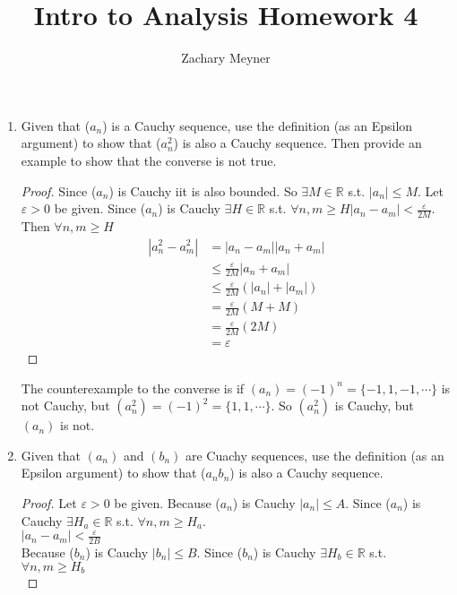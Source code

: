 \documentclass[12pt]{article}
\title{\large Intro to Analysis Homework 4}
\author{\large Zachary Meyner}
\date{}
\begin{document}
\maketitle
\begin{enumerate}
	\item Given that ($a_n$) is a Cauchy sequence, use the definition (as an Epsilon argument) to
	      show that ($a_n^2$) is also a Cauchy sequence. Then provide an example to show that the
	      converse is not true.
	      \begin{proof}
		      Since ($a_n$) is Cauchy iit is also bounded. So $\exists M \in \mathbb{R}$ s.t. $|a_n| \leq M$. Let $\varepsilon > 0$
		      be given. Since ($a_n$) is Cauchy $\exists H \in \mathbb{R}$ s.t. $\forall n,m \geq H |a_n-a_m| < \frac{\varepsilon}{2M}$. \\
		      Then $\forall n,m \geq H$
		      \begin{align*}
			      |a_n^2 - a_m^2| & = |a_n-a_m||a_n+a_m|                       \\
			                      & \leq \frac{\varepsilon}{2M}|a_n+a_m|       \\
			                      & \leq \frac{\varepsilon}{2M}(|a_n| + |a_m|) \\
			                      & = \frac{\varepsilon}{2M}(M+M)              \\
			                      & =\frac{\varepsilon}{2M}(2M)                \\
			                      & = \varepsilon
		      \end{align*}
	      \end{proof}
	      The counterexample to the converse is if ${(a_n)} = {(-1)}^n = \{-1, 1, -1, \cdots \}$ is not Cauchy,
	      but ${(a_n^2)} = {(-1)}^2 = \{1, 1, \cdots\}$. So $(a_n^2)$ is Cauchy, but $(a_n)$ is not.
	\item Given that $(a_n)$ and $(b_n)$ are Cuachy sequences, use the definition (as an Epsilon
	      argument) to show that ($a_{n}b_n$) is also a Cauchy sequence.
	      \begin{proof}
		      Let $\varepsilon > 0$ be given. Because ($a_n$) is Cauchy $|a_n| \leq A$. Since ($a_n$) is Cauchy
		      $\exists H_a \in \mathbb{R}$ s.t. $\forall n,m \geq H_a$. \\
		      $|a_n-a_m| < \frac{\varepsilon}{2B}$ \\
		      Because ($b_n$) is Cauchy $|b_n| \leq B$. Since ($b_n$) is Cauchy $\exists H_b \in \mathbb{R}$ s.t. $\forall n,m \geq H_b$ \\

\end{proof}
\end{enumerate}
\end{document}
